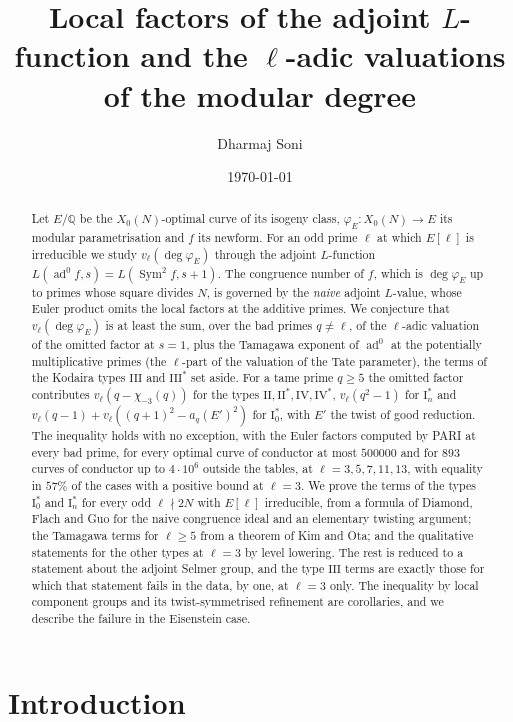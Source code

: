 \documentclass[11pt]{amsart}
\title[Local factors of the adjoint and the modular degree]{Local factors of the adjoint $L$-function and the $\ell$-adic valuations of the modular degree}
\author{Dharmaj Soni}
\date{\today}
\theoremstyle{definition}
\newcommand{\Q}{\mathbb{Q}}
\newcommand{\degphi}{\deg\varphi_E}
\newcommand{\ad}{\operatorname{ad}^0}
\newcommand{\Sym}{\operatorname{Sym}^2}
\begin{document}
\begin{abstract}
Let $E/\Q$ be the $X_0(N)$-optimal curve of its isogeny class, $\varphi_E\colon X_0(N)\to E$ its modular parametrisation and $f$ its newform. For an odd prime $\ell$ at which $E[\ell]$ is irreducible we study $v_\ell(\degphi)$ through the adjoint $L$-function $L(\ad f,s)=L(\Sym f,s+1)$. The congruence number of $f$, which is $\degphi$ up to primes whose square divides $N$, is governed by the \emph{naive} adjoint $L$-value, whose Euler product omits the local factors at the additive primes. We conjecture that $v_\ell(\degphi)$ is at least the sum, over the bad primes $q\ne\ell$, of the $\ell$-adic valuation of the omitted factor at $s=1$, plus the Tamagawa exponent of $\ad$ at the potentially multiplicative primes (the $\ell$-part of the valuation of the Tate parameter), the terms of the Kodaira types $\mathrm{III}$ and $\mathrm{III}^*$ set aside. For a tame prime $q\ge5$ the omitted factor contributes $v_\ell(q-\chi_{-3}(q))$ for the types $\mathrm{II},\mathrm{II}^*,\mathrm{IV},\mathrm{IV}^*$, $v_\ell(q^2-1)$ for $\mathrm{I}_n^*$ and $v_\ell(q-1)+v_\ell((q+1)^2-a_q(E')^2)$ for $\mathrm{I}_0^*$, with $E'$ the twist of good reduction. The inequality holds with no exception, with the Euler factors computed by PARI at every bad prime, for every optimal curve of conductor at most $500000$ and for $893$ curves of conductor up to $4\cdot10^6$ outside the tables, at $\ell=3,5,7,11,13$, with equality in $57\%$ of the cases with a positive bound at $\ell=3$. We prove the terms of the types $\mathrm{I}_0^*$ and $\mathrm{I}_n^*$ for every odd $\ell\nmid 2N$ with $E[\ell]$ irreducible, from a formula of Diamond, Flach and Guo for the naive congruence ideal and an elementary twisting argument; the Tamagawa terms for $\ell\ge5$ from a theorem of Kim and Ota; and the qualitative statements for the other types at $\ell=3$ by level lowering. The rest is reduced to a statement about the adjoint Selmer group, and the type $\mathrm{III}$ terms are exactly those for which that statement fails in the data, by one, at $\ell=3$ only. The inequality by local component groups and its twist-symmetrised refinement are corollaries, and we describe the failure in the Eisenstein case.
\end{abstract}

\maketitle

\section{Introduction}
\end{document}
